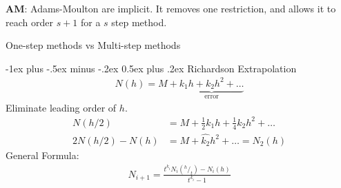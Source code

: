 \documentclass[10pt,landscape]{article}
\makeatletter
\renewcommand{\section}{\@startsection{section}{1}{0mm}%
                                {-1ex plus -.5ex minus -.2ex}%
                                {0.5ex plus .2ex}%
                                {\normalfont\large\bfseries}}
\makeatother
\begin{document}
\begin{multicols}{3}
\textbf{AM}: Adams-Moulton are implicit. It removes one restriction,
and allows it to reach order $s+1$ for a $s$ step method. 

One-step methods vs Multi-step methods

\section{Richardson Extrapolation}
\begin{align*}
  N(h) = M + \underbrace{k_{1}h + k_{2}h^{2} + \ldots}_{\text{error}}
\end{align*}
Eliminate leading order of $h$. 
\begin{align*}
  N(h/2) &= M + \frac{1}{2}k_{1}h + \frac{1}{4}k_{2}h^{2} + \ldots
\\
2 N(h/2) - N(h) &= M + \hat{k_{2}}h^{2} + \ldots = N_{2}(h)
\end{align*}
General Formula:
\begin{align*}
  N_{i+1} = \frac{t^{k_i} N_i(^h/_t) - N_i(h)}{t^{k_i} - 1}
\end{align*}


\end{multicols}
\end{document}
